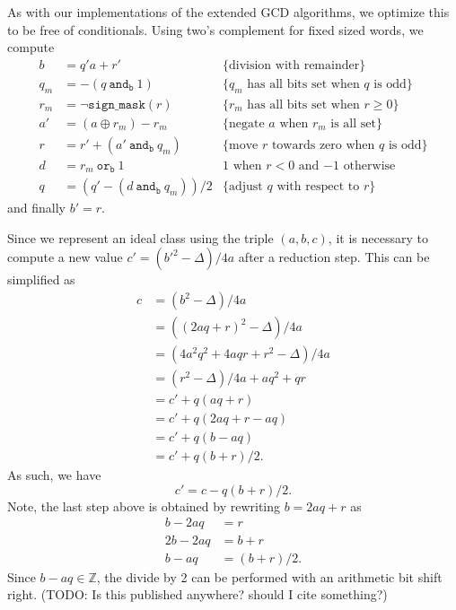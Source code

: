 \documentclass{ucalgthes1}
\theoremstyle{definition}
\newcommand{\ZZ}{\mathbb{Z}}
\newcommand{\band}{~\texttt{and}_\texttt{b}~}
\newcommand{\bor}{~\texttt{or}_\texttt{b}~}
\begin{document}
As with our implementations of the extended GCD algorithms, we optimize this to be free of conditionals.  Using two's complement for fixed sized words, we compute 
\begin{align*}
b   &= q'a + r' & \textrm{\{division with remainder\}}\\
q_m &= -(q \band 1) & \textrm{\{$q_m$ has all bits set when $q$ is odd\}} \\
r_m &= \lnot\texttt{sign\_mask}(r) & \textrm{\{$r_m$ has all bits set when $r \ge 0$\}} \\
a'  &= (a \oplus r_m) - r_m & \textrm{\{negate $a$ when $r_m$ is all set\}} \\
r   &= r' + (a' \band q_m) & \textrm{\{move $r$ towards zero when $q$ is odd\}} \\
d   &= r_m \bor 1 & \textrm{1 when $r < 0$ and $-1$ otherwise} \\
q   &= (q' - (d \band q_m))/2 & \textrm{\{adjust $q$ with respect to $r$\}}
\end{align*}
and finally $b' = r$.

Since we represent an ideal class using the triple $(a, b, c)$, it is necessary to compute a new value $c' = (b'^2 - \Delta)/4a$ after a reduction step.  This can be simplified as
\begin{align*}
	c &= (b^2 - \Delta)/4a \\
	  &= ((2aq + r)^2 - \Delta)/4a \\
	  &= (4a^2q^2 + 4aqr + r^2 - \Delta)/4a \\
	  &= (r^2 - \Delta)/4a + aq^2 + qr \\
	  &= c' + q(aq + r) \\
	  &= c' + q(2aq + r - aq) \\
	  &= c' + q(b - aq) \\
	  &= c' + q(b + r)/2.
\end{align*}
As such, we have
\[
c' = c - q(b + r)/2.
\]
Note, the last step above is obtained by rewriting $b = 2aq + r$ as
\begin{align*}
	b - 2aq &= r \\
	2b - 2aq &= b + r \\
	b - aq &= (b+r)/2.
\end{align*}
Since $b - aq \in \ZZ$, the divide by 2 can be performed with an arithmetic bit shift right. (TODO: Is this published anywhere? should I cite something?)
\end{document}
